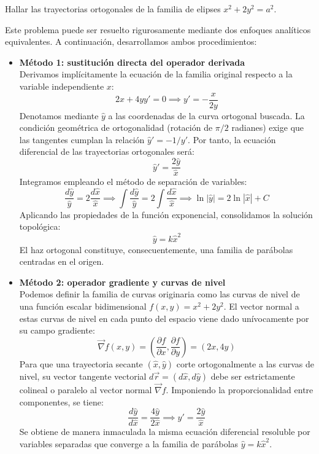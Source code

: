 \begin{ejercicio}
Hallar las trayectorias ortogonales de la familia de elipses $x^2 + 2y^2 = a^2$.
\end{ejercicio}

\begin{tcolorbox}
Este problema puede ser resuelto rigurosamente mediante dos enfoques analíticos equivalentes. A continuación, desarrollamos ambos procedimientos:

\begin{itemize}
    \item \textbf{Método 1: sustitución directa del operador derivada} \\
    Derivamos implícitamente la ecuación de la familia original respecto a la variable independiente $x$:
    $$ 2x + 4yy' = 0 \implies y' = -\frac{x}{2y} $$
    Denotamos mediante $\hat{y}$ a las coordenadas de la curva ortogonal buscada. La condición geométrica de ortogonalidad (rotación de $\pi/2$ radianes) exige que las tangentes cumplan la relación $\hat{y}' = -1/y'$. Por tanto, la ecuación diferencial de las trayectorias ortogonales será:
    $$ \hat{y}' = \frac{2\hat{y}}{\hat{x}} $$
    Integramos empleando el método de separación de variables:
    $$ \frac{d\hat{y}}{\hat{y}} = 2\frac{d\hat{x}}{\hat{x}} \implies \int \frac{d\hat{y}}{\hat{y}} = 2\int \frac{d\hat{x}}{\hat{x}} \implies \ln|\hat{y}| = 2\ln|\hat{x}| + C $$
    Aplicando las propiedades de la función exponencial, consolidamos la solución topológica:
    $$ \hat{y} = k\hat{x}^2 $$
    El haz ortogonal constituye, consecuentemente, una familia de parábolas centradas en el origen.

    \item \textbf{Método 2: operador gradiente y curvas de nivel} \\
    Podemos definir la familia de curvas originaria como las curvas de nivel de una función escalar bidimensional $f(x,y) = x^2 + 2y^2$. El vector normal a estas curvas de nivel en cada punto del espacio viene dado unívocamente por su campo gradiente:
    $$ \vec{\nabla}f(x,y) = \left( \frac{\partial f}{\partial x}, \frac{\partial f}{\partial y} \right) = (2x, 4y) $$
    Para que una trayectoria secante $(\hat{x}, \hat{y})$ corte ortogonalmente a las curvas de nivel, su vector tangente vectorial $d\vec{r} = (d\hat{x}, d\hat{y})$ debe ser estrictamente colineal o paralelo al vector normal $\vec{\nabla}f$. Imponiendo la proporcionalidad entre componentes, se tiene:
    $$ \frac{d\hat{y}}{d\hat{x}} = \frac{4\hat{y}}{2\hat{x}} \implies \hat{y}' = \frac{2\hat{y}}{\hat{x}} $$
    Se obtiene de manera inmaculada la misma ecuación diferencial resoluble por variables separadas que converge a la familia de parábolas $\hat{y} = k\hat{x}^2$.
\end{itemize}


\end{tcolorbox}
